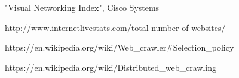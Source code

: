 \begin{thebibliography}{99}

"Visual Networking Index", Cisco Systems
  
http://www.internetlivestats.com/total-number-of-websites/
  
https://en.wikipedia.org/wiki/Web\_crawler\#Selection\_policy

https://en.wikipedia.org/wiki/Distributed\_web\_crawling

\end{thebibliography}